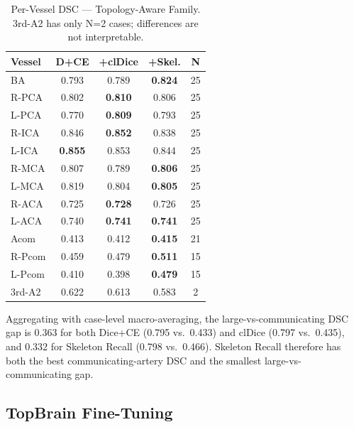 \documentclass[conference]{IEEEtran}
\begin{document}
\begin{table}[t]
\centering
\caption{Per-Vessel DSC --- Topology-Aware Family. 3rd-A2 has only N=2 cases; differences are not interpretable.}
\label{tab:stratified}
\begin{tabular}{lcccc}
\toprule
\textbf{Vessel} & \textbf{D+CE} & \textbf{+clDice} & \textbf{+Skel.} & \textbf{N} \\
\midrule
BA      & 0.793 & 0.789 & \textbf{0.824} & 25 \\
R-PCA   & 0.802 & \textbf{0.810} & 0.806 & 25 \\
L-PCA   & 0.770 & \textbf{0.809} & 0.793 & 25 \\
R-ICA   & 0.846 & \textbf{0.852} & 0.838 & 25 \\
L-ICA   & \textbf{0.855} & 0.853 & 0.844 & 25 \\
R-MCA   & 0.807 & 0.789 & \textbf{0.806} & 25 \\
L-MCA   & 0.819 & 0.804 & \textbf{0.805} & 25 \\
R-ACA   & 0.725 & \textbf{0.728} & 0.726 & 25 \\
L-ACA   & 0.740 & \textbf{0.741} & \textbf{0.741} & 25 \\
\midrule
Acom    & 0.413 & 0.412 & \textbf{0.415} & 21 \\
R-Pcom  & 0.459 & 0.479 & \textbf{0.511} & 15 \\
L-Pcom  & 0.410 & 0.398 & \textbf{0.479} & 15 \\
3rd-A2  & 0.622 & 0.613 & 0.583 & 2 \\
\bottomrule
\end{tabular}
\end{table}

Aggregating with case-level macro-averaging, the large-vs-communicating DSC gap is 0.363 for both Dice+CE (0.795 vs.\ 0.433) and clDice (0.797 vs.\ 0.435), and 0.332 for Skeleton Recall (0.798 vs.\ 0.466). Skeleton Recall therefore has both the best communicating-artery DSC and the smallest large-vs-communicating gap.

\subsection{TopBrain Fine-Tuning}
\end{document}
